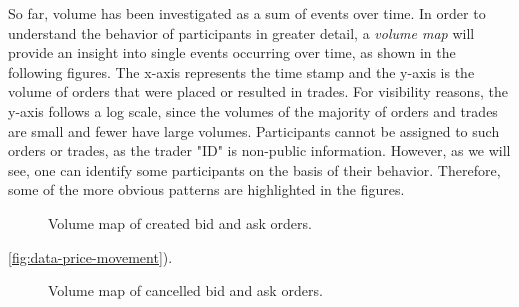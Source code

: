 So far, volume has been investigated as a sum of events over time.
In order to understand the behavior of participants in greater detail, a \textit{volume map} will provide an insight into single events occurring over time, as shown in the following figures.
The x-axis represents the time stamp and the y-axis is the volume of orders that were placed or resulted in trades.
For visibility reasons, the y-axis follows a log scale, since the volumes of the majority of orders and trades are small and fewer have large volumes.
Participants cannot be assigned to such orders or trades, as the trader "ID" is non-public information.
However, as we will see, one can identify some participants on the basis of their behavior.
Therefore, some of the more obvious patterns are highlighted in the figures.
\begin{figure}[H]
    \centering
    \caption{Volume map of created bid and ask orders.}
    \label{fig:data-volmap-crated}
\end{figure}
\ref{fig:data-price-movement}).
\begin{figure}[H]
    \centering
    \caption{Volume map of cancelled bid and ask orders.}
    \label{fig:data-volmap-cancelled}
\end{figure}
